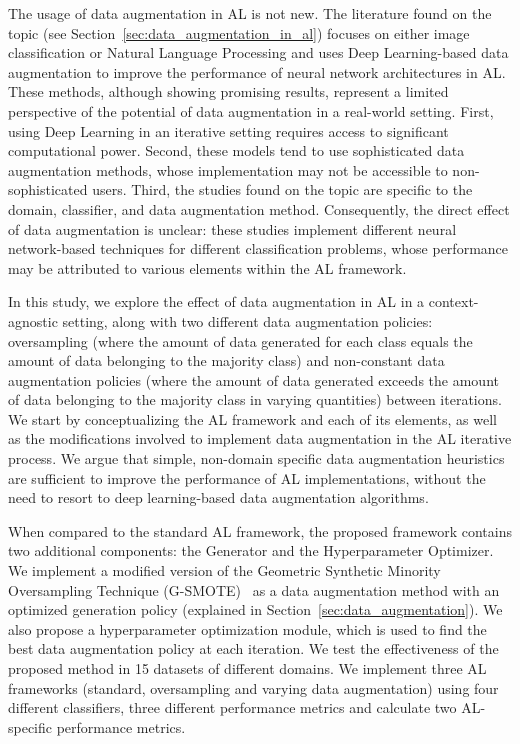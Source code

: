 \documentclass[parskip=full]{scrartcl}
\begin{document}
The usage of data augmentation in AL is not new. The literature found on the
topic (see Section~\ref{sec:data_augmentation_in_al}) focuses on either image
classification or Natural Language Processing and uses Deep Learning-based
data augmentation to improve the performance of neural network architectures
in AL\@. These methods, although showing promising results, represent a
limited perspective of the potential of data augmentation in a real-world
setting. First, using Deep Learning in an iterative setting requires access to
significant computational power. Second, these models tend to use
sophisticated data augmentation methods, whose implementation may not be
accessible to non-sophisticated users. Third, the studies found on the topic
are specific to the domain, classifier, and data augmentation method.
Consequently, the direct effect of data augmentation is unclear: these studies
implement different neural network-based techniques for different
classification problems, whose performance may be attributed to various
elements within the AL framework.

In this study, we explore the effect of data augmentation in AL in a
context-agnostic setting, along with two different data augmentation policies:
oversampling (where the amount of data generated for each class equals the
amount of data belonging to the majority class) and non-constant data
augmentation policies (where the amount of data generated exceeds the amount
of data belonging to the majority class in varying quantities) between
iterations. We start by conceptualizing the AL framework and each of its
elements, as well as the modifications involved to implement data augmentation
in the AL iterative process. We argue that simple, non-domain specific data
augmentation heuristics are sufficient to improve the performance of AL
implementations, without the need to resort to deep learning-based data
augmentation algorithms.

When compared to the standard AL framework, the proposed framework contains
two additional components: the Generator and the Hyperparameter Optimizer. We
implement a modified version of the Geometric Synthetic Minority Oversampling
Technique (G-SMOTE)~\cite{Douzas2019} as a data augmentation method with an
optimized generation policy (explained in
Section~\ref{sec:data_augmentation}). We also propose a hyperparameter
optimization module, which is used to find the best data augmentation policy
at each iteration. We test the effectiveness of the proposed method in 15
datasets of different domains. We implement three AL frameworks (standard,
oversampling and varying data augmentation) using four different classifiers,
three different performance metrics and calculate two AL-specific performance
metrics. 
\end{document}
